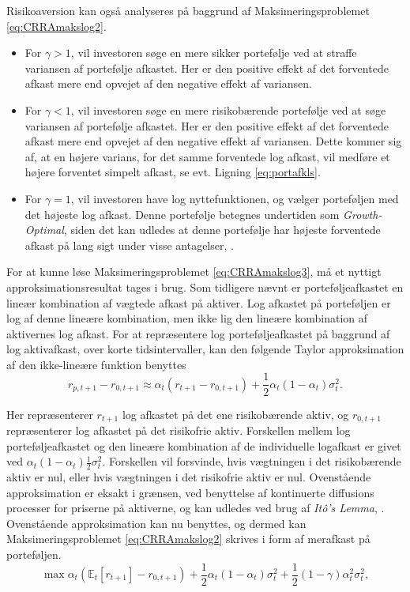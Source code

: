 \documentclass[
  a4paper,
  oneside]{memoir}
\begin{document}
Risikoaversion kan også analyseres på baggrund af Maksimeringsproblemet \eqref{eq:CRRAmakslog2}.

\begin{itemize}
\item
  For \(\gamma>1\), vil investoren søge en mere sikker portefølje ved at straffe variansen af portefølje afkastet. Her er den positive effekt af det forventede afkast mere end opvejet af den negative effekt af variansen.
\item
  For \(\gamma<1\), vil investoren søge en mere risikobærende portefølje ved at søge variansen af portefølje afkastet. Her er den positive effekt af det forventede afkast mere end opvejet af den negative effekt af variansen. Dette kommer sig af, at en højere varians, for det samme forventede log afkast, vil medføre et højere forventet simpelt afkast, se evt. Ligning \eqref{eq:portafkls}.
\item
  For \(\gamma=1\), vil investoren have log nyttefunktionen, og vælger porteføljen med det højeste log afkast. Denne portefølje betegnes undertiden som \emph{Growth-Optimal}, siden det kan udledes at denne portefølje har højeste forventede afkast på lang sigt under visse antagelser, \citep{Kelly1956}.
\end{itemize}

For at kunne løse Maksimeringsproblemet \eqref{eq:CRRAmakslog3}, må et nyttigt approksimationsresultat tages i brug. Som tidligere nævnt er porteføljeafkastet en lineær kombination af vægtede afkast på aktiver. Log afkastet på porteføljen er log af denne lineære kombination, men ikke lig den lineære kombination af aktivernes log afkast. For at repræsentere log porteføljeafkastet på baggrund af log aktivafkast, over korte tidsintervaller, kan den følgende Taylor approksimation af den ikke-lineære funktion benyttes
\[r_{p,t+1}-r_{0,t+1}\approx \alpha_t (r_{t+1}-r_{0,t+1})+\frac{1}{2}\alpha_t(1-\alpha_t)\sigma_t^2.\]

Her repræsenterer \(r_{t+1}\) log afkastet på det ene risikobærende aktiv, og \(r_{0,t+1}\) repræsenterer log afkastet på det risikofrie aktiv. Forskellen mellem log porteføljeafkastet og den lineære kombination af de individuelle logafkast er givet ved \(\alpha_t(1-\alpha_t)\tfrac{1}{2}\sigma_t^2\). Forskellen vil forsvinde, hvis vægtningen i det risikobærende aktiv er nul, eller hvis vægtningen i det risikofrie aktiv er nul. Ovenstående approksimation er eksakt i grænsen, ved benyttelse af kontinuerte diffusions processer for priserne på aktiverne, og kan udledes ved brug af \emph{Itô's Lemma}, \citep{CampVicCha2003}. Ovenstående approksimation kan nu benyttes, og dermed kan Maksimeringsproblemet \eqref{eq:CRRAmakslog2} skrives i form af merafkast på porteføljen.
\begin{equation}
\max\alpha_t(\mathbb{E}_t[r_{t+1}] - r_{0,t+1}) + \frac{1}{2}\alpha_t(1-\alpha_t)\sigma_t^2 + \frac{1}{2}(1-\gamma)\alpha_t^2\sigma_t^2, \label{eq:CRRAmakslog4} 
\end{equation}
\end{document}
